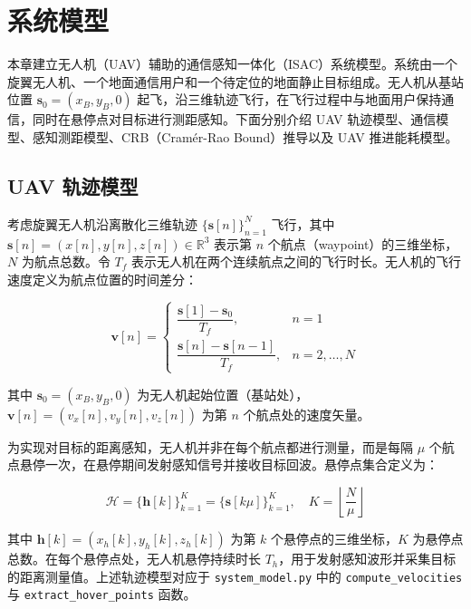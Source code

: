 \chapter{系统模型}

本章建立无人机（UAV）辅助的通信感知一体化（ISAC）系统模型。系统由一个旋翼无人机、一个地面通信用户和一个待定位的地面静止目标组成。无人机从基站位置 $\mathbf{s}_0=(x_B, y_B, 0)$ 起飞，沿三维轨迹飞行，在飞行过程中与地面用户保持通信，同时在悬停点对目标进行测距感知。下面分别介绍 UAV 轨迹模型、通信模型、感知测距模型、CRB（Cram\'{e}r-Rao Bound）推导以及 UAV 推进能耗模型。

\section{UAV 轨迹模型}

考虑旋翼无人机沿离散化三维轨迹 $\{\mathbf{s}[n]\}_{n=1}^{N}$ 飞行，其中 $\mathbf{s}[n]=(x[n], y[n], z[n])\in\mathbb{R}^3$ 表示第 $n$ 个航点（waypoint）的三维坐标，$N$ 为航点总数。令 $T_f$ 表示无人机在两个连续航点之间的飞行时长。无人机的飞行速度定义为航点位置的时间差分：

\begin{equation}
\mathbf{v}[n]=\begin{cases}
\dfrac{\mathbf{s}[1]-\mathbf{s}_0}{T_f}, & n=1 \\[10pt]
\dfrac{\mathbf{s}[n]-\mathbf{s}[n-1]}{T_f}, & n=2,\ldots,N
\end{cases}
\label{eq:velocity}
\end{equation}

其中 $\mathbf{s}_0=(x_B, y_B, 0)$ 为无人机起始位置（基站处），$\mathbf{v}[n]=(v_x[n], v_y[n], v_z[n])$ 为第 $n$ 个航点处的速度矢量。

为实现对目标的距离感知，无人机并非在每个航点都进行测量，而是每隔 $\mu$ 个航点悬停一次，在悬停期间发射感知信号并接收目标回波。悬停点集合定义为：

\begin{equation}
\mathcal{H}=\bigl\{\mathbf{h}[k]\bigr\}_{k=1}^{K}=\bigl\{\mathbf{s}[k\mu]\bigr\}_{k=1}^{K},\quad K=\left\lfloor\frac{N}{\mu}\right\rfloor
\label{eq:hover_points}
\end{equation}

其中 $\mathbf{h}[k]=(x_h[k], y_h[k], z_h[k])$ 为第 $k$ 个悬停点的三维坐标，$K$ 为悬停点总数。在每个悬停点处，无人机悬停持续时长 $T_h$，用于发射感知波形并采集目标的距离测量值。上述轨迹模型对应于 \texttt{system\_model.py} 中的 \texttt{compute\_velocities} 与 \texttt{extract\_hover\_points} 函数。

